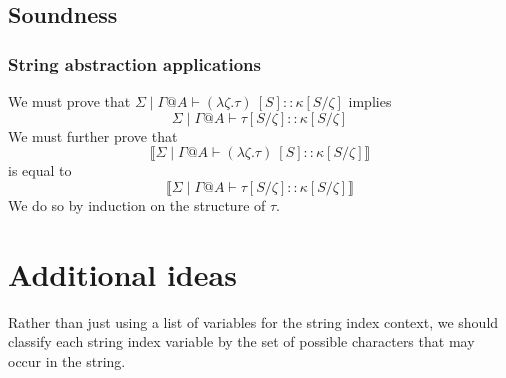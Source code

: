 \documentclass{article}
\newcommand{\sem}[1]{\llbracket #1 \rrbracket}
\begin{document}
\subsection*{Soundness}

\subsubsection*{String abstraction applications}

We must prove that $\Sigma \mid \Gamma @ A \vdash (\lambda \zeta.\tau)~[S] :: \kappa[S/\zeta]$ implies 
$$\Sigma \mid \Gamma @ A \vdash \tau[S/\zeta] :: \kappa[S/\zeta]$$
We must further prove that $$\sem{\Sigma \mid \Gamma @ A \vdash (\lambda \zeta.\tau)~[S] :: \kappa[S/\zeta]}$$
is equal to $$\sem{\Sigma \mid \Gamma @ A \vdash \tau[S/\zeta] :: \kappa[S/\zeta]}$$
We do so by induction on the structure of $\tau$.

\section*{Additional ideas}

Rather than just using a list of variables for the string index context, we should classify each
string index variable by the set of possible characters that may occur in the string. 
 
\end{document}

